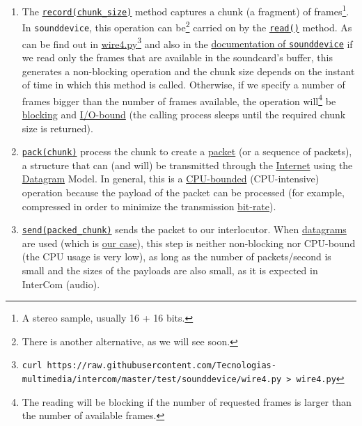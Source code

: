\begin{enumerate}
\item The \href{https://github.com/Tecnologias-multimedia/InterCom/blob/master/src/minimal.py#L156}{\texttt{record(chunk\_size)}}
  method captures a chunk (a fragment) of frames\footnote{A stereo
  sample, usually 16 + 16 bits.}. In \verb|sounddevice|, this
  operation can be\footnote{There is another alternative, as we will
  see soon.}  carried on by the
  \href{https://python-sounddevice.readthedocs.io/en/0.4.0/api/streams.html#sounddevice.Stream.read}{\texttt{read()}}
  method. As can be find out in
  \href{https://raw.githubusercontent.com/Tecnologias-multimedia/intercom/master/test/sounddevice/wire4.py}{wire4.py}\footnote{
  \texttt{curl
    https://raw.githubusercontent.com/Tecnologias-multimedia/intercom/master/test/sounddevice/wire4.py
    > wire4.py}} and also in the
  \href{https://python-sounddevice.readthedocs.io/en/0.5.3/api/streams.html#sounddevice.Stream.read}{documentation
    of \texttt{sounddevice}} if we read only the frames that are
  available in the soundcard's buffer, this generates a non-blocking
  operation and the chunk size depends on the instant of time in which
  this method is called. Otherwise, if we specify a number of frames
  bigger than the number of frames available, the operation
  will\footnote{The reading will be blocking if the number of
  requested frames is larger than the number of available frames.} be
  \href{https://python-sounddevice.readthedocs.io/en/0.4.0/api/streams.html#sounddevice.Stream.write}{blocking}
  and \href{https://en.wikipedia.org/wiki/I/O_bound}{I/O-bound} (the
  calling process sleeps until the required chunk size is returned).

\item \href{https://github.com/Tecnologias-multimedia/InterCom/blob/master/src/minimal.py#L89}{\texttt{pack(chunk)}}
  process the chunk to create a
  \href{https://en.wikipedia.org/wiki/Network_packet}{packet} (or a
  sequence of packets), a structure that can (and will) be transmitted
  through the \href{https://en.wikipedia.org/wiki/Internet}{Internet}
  using the \href{https://en.wikipedia.org/wiki/Datagram}{Datagram}
  Model. In general, this is a
  \href{https://en.wikipedia.org/wiki/CPU-bound}{CPU-bounded}
  (CPU-intensive) operation because the payload of the packet can be
  processed (for example, compressed in order to minimize the
  transmission
  \href{https://en.wikipedia.org/wiki/Bit_rate}{bit-rate}).

\item \href{https://github.com/Tecnologias-multimedia/InterCom/blob/master/src/minimal.py#L102}{\texttt{send(packed\_chunk)}}
  sends the packet to our interlocutor. When
  \href{https://en.wikipedia.org/wiki/Datagram}{datagrams} are used
  (which is
  \href{https://github.com/Tecnologias-multimedia/InterCom/blob/master/src/minimal.py#L92}{our
    case}), this step is neither non-blocking nor CPU-bound (the CPU
  usage is very low), as long as the number of packets/second is small
  and the sizes of the payloads are also small, as it is expected in
  InterCom (audio).


\end{enumerate}
